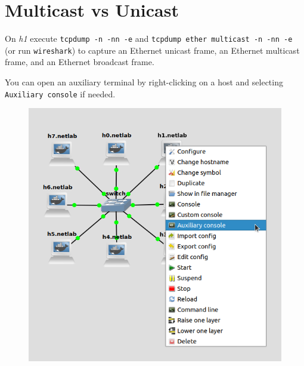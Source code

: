\documentclass{../UTNetLab}
\begin{document}
\section{Multicast vs Unicast\label{sec:multicast-vs-unicast}}
    On \textit{h1} execute \lstinline{tcpdump -n -nn -e} and \lstinline{tcpdump ether multicast -n -nn -e} (or run \lstinline{wireshark}) to capture an Ethernet unicast frame, an Ethernet multicast frame, and an Ethernet broadcast frame.

    You can open an auxiliary terminal by right-clicking on a host and selecting \texttt{Auxiliary console} if needed.
    \begin{figure}[H]
        \centering
        \includegraphics[scale=1.6]{img/auxiliary}
    \end{figure}
\end{document}
